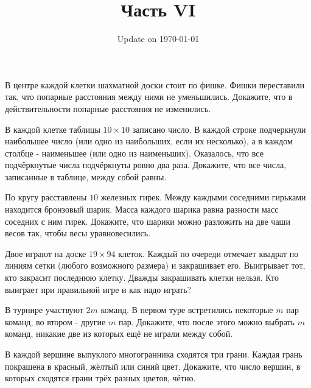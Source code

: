 \documentclass[12pt]{article}
\begin{document}
\fontsize{12}{12}\selectfont

\title{\bf \huge Часть VI}
\date{Update on \today}
\maketitle 

\begin{task}
В центре каждой клетки шахматной доски стоит по фишке. Фишки переставили так, что попарные расстояния между ними не уменьшились. Докажите, что в действительности попарные расстояния не изменились. 
\end{task}

\begin{task}
В каждой клетке таблицы $10 \times 10$ записано число. В каждой строке подчеркнули наибольшее число (или одно из наибольших, если их несколько), а в каждом столбце - наименьшее (или одно из наименьших). Оказалось, что все подчёркнутые числа подчёркнуты ровно два раза. Докажите, что все числа, записанные в таблице, между собой равны.
\end{task}

\begin{task}
По кругу расставлены $10$ железных гирек. Между каждыми соседними гирьками находится бронзовый шарик. Масса каждого шарика равна разности масс соседних с ним гирек. Докажите, что шарики можно разложить на две чаши весов так, чтобы весы уравновесились. 
\end{task}

\begin{task}
Двое играют на доске $19 \times 94$ клеток. Каждый по очереди отмечает квадрат по линиям сетки (любого возможного размера) и закрашивает его. Выигрывает тот, кто закрасит последнюю клетку. Дважды закрашивать клетки нельзя. Кто выиграет при правильной игре и как надо играть?
\end{task}

\begin{task}
В турнире участвуют $2m$ команд. В первом туре встретились некоторые $m$ пар команд, во втором - другие $m$ пар. Докажите, что после этого можно выбрать $m$ команд, никакие две из которых ещё не играли между собой.
\end{task}

\begin{task}
В каждой вершине выпуклого многогранника сходятся три грани. Каждая грань покрашена в красный, жёлтый или синий цвет. Докажите, что число вершин, в которых сходятся грани трёх разных цветов, чётно.
\end{task}
\end{document}
